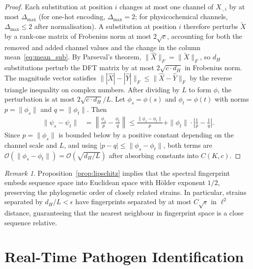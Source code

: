 \documentclass[twocolumn,11pt,a4paper]{article}
\theoremstyle{definition}
\theoremstyle{remark}
\newtheorem{remark}[theorem]{Remark}
\newcommand{\bigO}{\mathcal{O}}
\begin{document}
\begin{proof}
Each substitution at position $i$ changes at most one channel of $X_{\cdot,i}$
by at most $\Delta_{\max}$ (for one-hot encoding, $\Delta_{\max} = 2$; for
physicochemical channels, $\Delta_{\max} \leq 2$ after normalisation). A
substitution at position $i$ therefore perturbs $\widetilde{X}$ by a rank-one
matrix of Frobenius norm at most $2\sqrt{c}$, accounting for both the removed
and added channel values and the change in the column mean~\eqref{eq:mean_sub}.
By Parseval's theorem, $\|\widehat{X}\|_F = \|\widetilde{X}\|_F$, so $d_H$
substitutions perturb the DFT matrix by at most $2\sqrt{c \cdot d_H}$ in
Frobenius norm. The magnitude vector satisfies
$\||\widehat{X}| - |\widehat{Y}|\|_F \leq \|\widehat{X} - \widehat{Y}\|_F$
by the reverse triangle inequality on complex numbers. After dividing by $L$ to
form $\phi$, the perturbation is at most $2\sqrt{c \cdot d_H}/L$. Let
$\phi_s = \phi(s)$ and $\phi_t = \phi(t)$ with norms $p = \|\phi_s\|$ and
$q = \|\phi_t\|$. Then
\begin{align}
  \|\psi_s - \psi_t\| &= \left\|\frac{\phi_s}{p} - \frac{\phi_t}{q}\right\|
  \leq \frac{\|\phi_s - \phi_t\|}{p} + \|\phi_t\|\cdot\left|\frac{1}{p} -
  \frac{1}{q}\right|.
\end{align}
Since $p = \|\phi_s\|$ is bounded below by a positive constant depending on the
channel scale and $L$, and using $|p - q| \leq \|\phi_s - \phi_t\|$, both
terms are $\bigO(\|\phi_s - \phi_t\|) = \bigO(\sqrt{d_H/L})$ after absorbing
constants into $C(K, c)$.
\end{proof}

\begin{remark}
Proposition~\ref{prop:lipschitz} implies that the spectral fingerprint embeds
sequence space into Euclidean space with H\"{o}lder exponent $1/2$, preserving
the phylogenetic order of closely related strains. In particular, strains
separated by $d_H/L < \epsilon$ have fingerprints separated by at most
$C\sqrt{\epsilon}$ in $\ell^2$ distance, guaranteeing that the nearest neighbour
in fingerprint space is a close sequence relative.
\end{remark}

\section{Real-Time Pathogen Identification}
\label{sec:identification}
\end{document}

